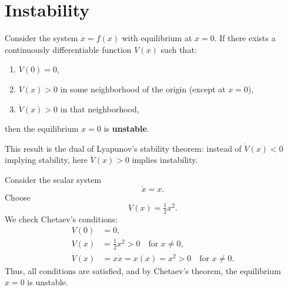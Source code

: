 \section{Instability}

\begin{theorem}
Consider the system $\dot x = f(x)$ with equilibrium at $x=0$.  
If there exists a continuously differentiable function $V(x)$ such that:
\begin{enumerate}
  \item $V(0)=0$,
  \item $V(x)>0$ in some neighborhood of the origin (except at $x=0$),
  \item $\dot V(x)>0$ in that neighborhood,
\end{enumerate}
then the equilibrium $x=0$ is \textbf{unstable}.
\end{theorem}

\begin{remark}
This result is the dual of Lyapunov’s stability theorem:  
instead of $\dot V(x)<0$ implying stability, here $\dot V(x)>0$ implies instability.
\end{remark}

\begin{example}
Consider the scalar system
\[
\dot x = x.
\]
Choose
\[
V(x) = \tfrac{1}{2} x^2.
\]
We check Chetaev’s conditions:
\begin{align*}
V(0) &= 0, \\
V(x) &= \tfrac{1}{2}x^2 > 0 \quad \text{for } x\neq 0, \\
\dot V(x) &= x \dot x = x(x) = x^2 > 0 \quad \text{for } x\neq 0.
\end{align*}
Thus, all conditions are satisfied, and by Chetaev’s theorem,  
the equilibrium $x=0$ is unstable.
\end{example}
